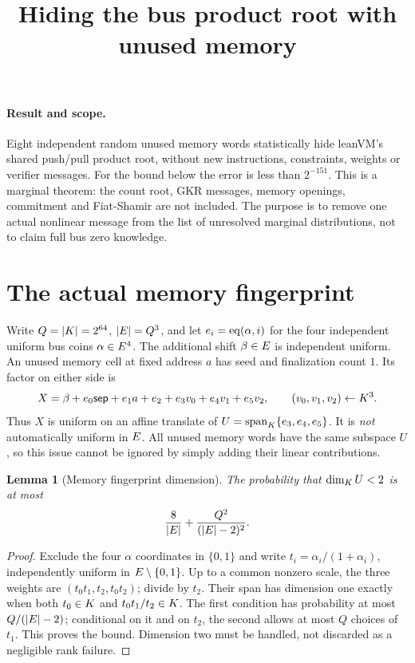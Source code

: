 \documentclass[11pt]{article}
\title{Hiding the bus product root with unused memory}
\author{}
\date{}
\newtheorem{lemma}[theorem]{Lemma}
\begin{document}
\maketitle
\vspace{-2em}

\paragraph{Result and scope.} Eight independent random unused memory words statistically hide leanVM's shared push/pull product root, without new instructions, constraints, weights or verifier messages. For the bound below the error is less than $2^{-151}$. This is a marginal theorem: the count root, GKR messages, memory openings, commitment and Fiat-Shamir are not included. The purpose is to remove one actual nonlinear message from the list of unresolved marginal distributions, not to claim full bus zero knowledge.

\section{The actual memory fingerprint}

Write $Q=|K|=2^{64}$, $|E|=Q^3$, and let $e_i=\operatorname{eq}(\alpha,i)$ for the four independent uniform bus coins $\alpha\in E^4$. The additional shift $\beta\in E$ is independent uniform. An unused memory cell at fixed address $a$ has seed and finalization count $1$. Its factor on either side is
\[
 X=\beta+e_0\mathsf{sep}+e_1a+e_2+e_3v_0+e_4v_1+e_5v_2,
 \qquad (v_0,v_1,v_2)\gets K^3.
\]
Thus $X$ is uniform on an affine translate of $U=\operatorname{span}_{K}\{e_3,e_4,e_5\}$. It is \emph{not} automatically uniform in $E$. All unused memory words have the same subspace $U$, so this issue cannot be ignored by simply adding their linear contributions.

\begin{lemma}[Memory fingerprint dimension]\label{lem:bus-dim}
The probability that $\dim_{K}U<2$ is at most
\[
 \frac8{|E|}+\frac{Q^2}{(|E|-2)^2}.
\]
\end{lemma}
\begin{proof}
Exclude the four $\alpha$ coordinates in $\{0,1\}$ and write $t_i=\alpha_i/(1+\alpha_i)$, independently uniform in $E\setminus\{0,1\}$. Up to a common nonzero scale, the three weights are $(t_0t_1,t_2,t_0t_2)$; divide by $t_2$. Their span has dimension one exactly when both $t_0\in K$ and $t_0t_1/t_2\in K$. The first condition has probability at most $Q/(|E|-2)$; conditional on it and on $t_2$, the second allows at most $Q$ choices of $t_1$. This proves the bound. Dimension two must be handled, not discarded as a negligible rank failure.
\end{proof}
\end{document}

